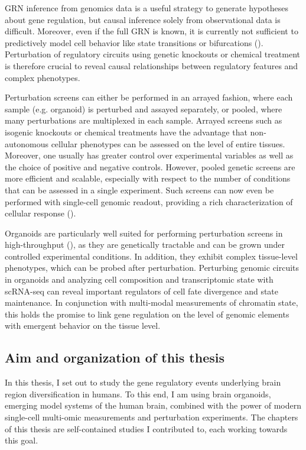 GRN inference from genomics data is a useful strategy to generate hypotheses about gene regulation, but causal inference solely from observational data is difficult. Moreover, even if the full GRN is known, it is currently not sufficient to predictively model cell behavior like state transitions or bifurcations (\cite{teschendorff_statistical_2021}). Perturbation of regulatory circuits using genetic knockouts or chemical treatment is therefore crucial to reveal causal relationships between regulatory features and complex phenotypes.

Perturbation screens can either be performed in an arrayed fashion, where each sample (e.g. organoid) is perturbed and assayed separately, or pooled, where many perturbations are multiplexed in each sample. Arrayed screens such as isogenic knockouts or chemical treatments have the advantage that non-autonomous cellular phenotypes can be assessed on the level of entire tissues. Moreover, one usually has greater control over experimental variables as well as the choice of positive and negative controls. However, pooled genetic screens are more efficient and scalable, especially with respect to the number of conditions that can be assessed in a single experiment. Such screens can now even be performed with single-cell genomic readout, providing a rich characterization of cellular response (\cite{dixit_perturb-seq_2016,datlinger_pooled_2017}). 

Organoids are particularly well suited for performing perturbation screens in high-throughput (\cite{camp_mapping_2019}), as they are genetically tractable and can be grown under controlled experimental conditions. In addition, they exhibit complex tissue-level phenotypes, which can be probed after perturbation. Perturbing genomic circuits in organoids and analyzing cell composition and transcriptomic state with scRNA-seq can reveal important regulators of cell fate divergence and state maintenance. In conjunction with multi-modal measurements of chromatin state, this holds the promise to link gene regulation on the level of genomic elements with emergent behavior on the tissue level.



\subsection{Aim and organization of this thesis}

In this thesis, I set out to study the gene regulatory events underlying brain region diversification in humans. To this end, I am using brain organoids, emerging model systems of the human brain, combined with the power of modern single-cell multi-omic measurements and perturbation experiments. The chapters of this thesis are self-contained studies I contributed to, each working towards this goal.

